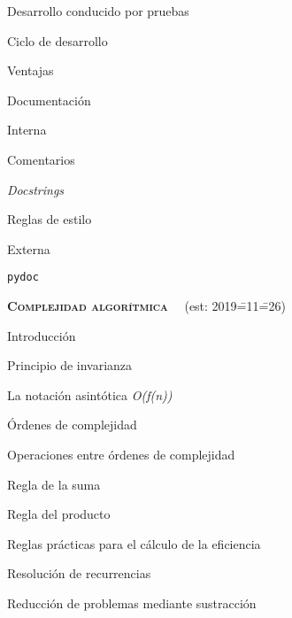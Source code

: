 \begin{longenum}
\begin{longenum}
\begin{longenum}
            \item Desarrollo conducido por pruebas
            \begin{longenum}
                \item Ciclo de desarrollo
                \item Ventajas
            \end{longenum}
        \end{longenum}
        \item Documentación
        \begin{longenum}
            \item Interna
            \begin{longenum}
                \item Comentarios
                \item \textit{Docstrings}
                \item Reglas de estilo
            \end{longenum}
            \item Externa
            \begin{longenum}
                \item \texttt{pydoc}
            \end{longenum}
        \end{longenum}
    \end{longenum}
    \item \textbf{\textsc{Complejidad algorítmica}} \ \opcional\ (est: 2019\==11\==26)
    \begin{longenum}
        \item Introducción
        \item Principio de invarianza
        \item La notación asintótica \textit{O(f(n))}
        \item Órdenes de complejidad
        \item Operaciones entre órdenes de complejidad
        \begin{longenum}
            \item Regla de la suma
            \item Regla del producto
        \end{longenum}
        \item Reglas prácticas para el cálculo de la eficiencia
        \item Resolución de recurrencias
        \begin{longenum}
            \item Reducción de problemas mediante sustracción

\end{longenum}
\end{longenum}
\end{longenum}
